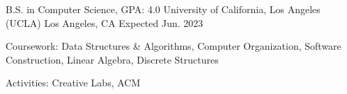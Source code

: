 

\begin{cventries}

  \cventry
    {B.S. in Computer Science, GPA: 4.0} %
    {University of California, Los Angeles (UCLA)} %
    {Los Angeles, CA} %
    {Expected Jun. 2023} %
    {
      \begin{cvitems} %
        \item {Coursework: Data Structures \& Algorithms, Computer Organization,
        Software Construction, Linear Algebra, Discrete Structures}
        \item {Activities: Creative Labs, ACM}
      \end{cvitems}
    }

\end{cventries}
